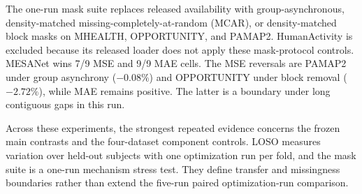 The one-run mask suite replaces released availability with group-asynchronous,
density-matched missing-completely-at-random (MCAR), or density-matched block
masks on MHEALTH, OPPORTUNITY, and PAMAP2. HumanActivity is excluded because
its released loader does not apply these mask-protocol controls. MESANet wins
7/9 MSE and 9/9 MAE cells. The MSE reversals are PAMAP2 under group
asynchrony ($-0.08\%$) and OPPORTUNITY under block removal ($-2.72\%$), while
MAE remains positive. The latter is a boundary under long contiguous gaps in
this run.

Across these experiments, the strongest repeated evidence concerns the frozen
main contrasts and the four-dataset component controls. LOSO measures variation
over held-out subjects with one optimization run per fold, and the mask suite
is a one-run mechanism stress test. They define transfer and missingness
boundaries rather than extend the five-run paired optimization-run comparison.
